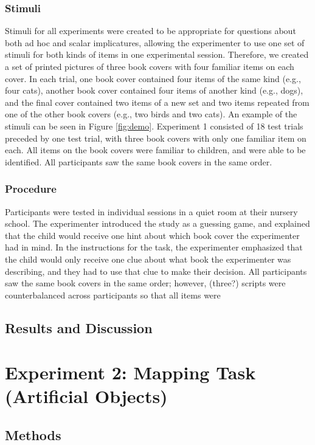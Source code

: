 \documentclass[man]{apa2}
\begin{document}
\subsubsection{Stimuli}
Stimuli for all experiments were created to be appropriate for questions about both ad hoc and scalar implicatures, allowing the experimenter to use one set of stimuli for both kinds of items in one experimental session. Therefore, we created a set of printed pictures of three book covers with four familiar items on each cover. In each trial, one book cover contained four items of the same kind (e.g., four cats), another book cover contained four items of another kind (e.g., dogs), and the final cover contained two items of a new set and two items repeated from one of the other book covers (e.g., two birds and two cats). An example of the stimuli can be seen in Figure \ref{fig:demo}. Experiment 1 consisted of 18 test trials preceded by one test trial, with three book covers with only one familiar item on each. All items on the book covers were familiar to children, and were able to be identified. All participants saw the same book covers in the same order. 


\subsubsection{Procedure}
Participants were tested in individual sessions in a quiet room at their nursery school. The experimenter introduced the study as a guessing game, and explained that the child would receive one hint about which book cover the experimenter had in mind. In the instructions for the task, the experimenter emphasized that the child would only receive one clue about what book the experimenter was describing, and they had to use that clue to make their decision. All participants saw the same book covers in the same order; however, (three?) scripts were counterbalanced across participants so that all items were 

\subsection{Results and Discussion}



\section{Experiment 2: Mapping Task (Artificial Objects)}


\subsection{Methods}
\end{document}
